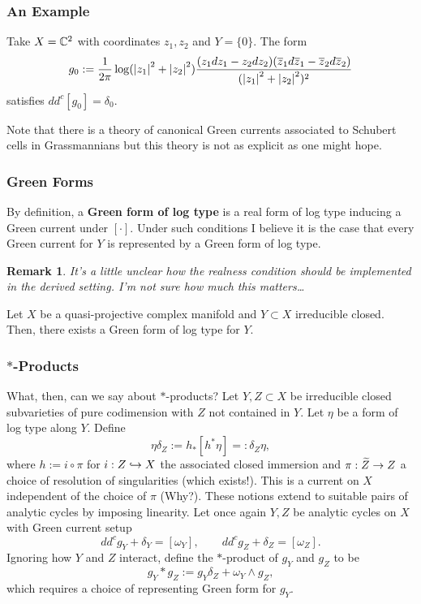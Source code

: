 \documentclass[11pt]{beamer}
\newtheorem{remark}{Remark}
\begin{document}
\begin{frame}
\frametitle{An Example}
\begin{example}
Take $X=\mathbb{C}^2$ with coordinates $z_1,z_2$ and $Y=\{0\}$. The form 
$$g_0:=\dfrac{1}{2\pi}\log(\left\lvert z_1\right\rvert^2+\left\lvert z_2\right\rvert^2)\dfrac{(z_1dz_1-z_2dz_2)(\overline{z}_1d\overline{z}_1-\overline{z}_2d\overline{z}_2)}{(\left\lvert z_1\right\rvert^2+\left\lvert z_2\right\rvert^2)^2}$$
satisfies $dd^c[g_0]=\delta_0$.
\end{example}

Note that there is a theory of canonical Green currents associated to Schubert cells in Grassmannians but this theory is not as explicit as one might hope.
\end{frame}

\begin{frame}
\frametitle{Green Forms}
By definition, a \textbf{Green form of log type} is a real form of log type inducing a Green current under $[\cdot]$. Under such conditions I believe it is the case that every Green current for $Y$ is represented by a Green form of log type.

\begin{remark}
It's a little unclear how the realness condition should be implemented in the derived setting. I'm not sure how much this matters\ldots
\end{remark}

\begin{theorem}
Let $X$ be a quasi-projective complex manifold and $Y\subset X$ irreducible closed. Then, there exists a Green form of log type for $Y$.
\end{theorem}
\end{frame}

\begin{frame}
\frametitle{$*$-Products}
What, then, can we say about $*$-products? Let $Y,Z\subset X$ be irreducible closed subvarieties of pure codimension with $Z$ not contained in $Y$. Let $\eta$ be a form of log type along $Y$. Define 
$$\eta\delta_Z:=h_*[h^*\eta]=:\delta_Z\eta,$$ 
where $h:=i\circ\pi$ for $i: Z\hookrightarrow X$ the associated closed immersion and $\pi: \widetilde{Z}\to Z$ a choice of resolution of singularities (which exists!). This is a current on $X$ independent of the choice of $\pi$ (Why?). These notions extend to suitable pairs of analytic cycles by imposing linearity. Let once again $Y,Z$ be analytic cycles on $X$ with Green current setup
$$dd^cg_Y+\delta_Y=[\omega_Y],\qquad dd^cg_Z+\delta_Z=[\omega_Z].$$
Ignoring how $Y$ and $Z$ interact, define the $*$-product of $g_Y$ and $g_Z$ to be 
$$g_Y*g_Z:=g_Y\delta_Z+\omega_Y\wedge g_Z,$$
which requires a choice of representing Green form for $g_Y$.
\end{frame}
\end{document}
